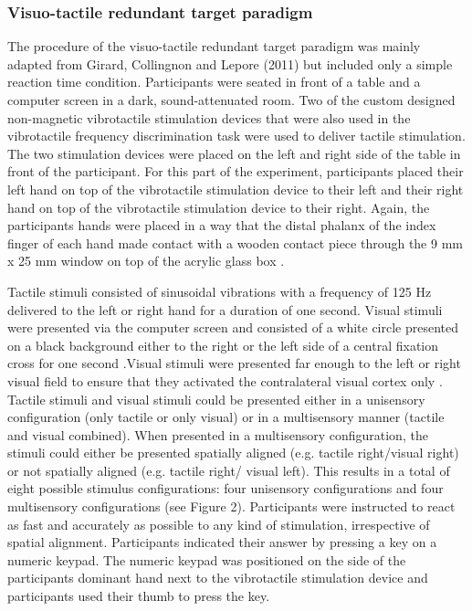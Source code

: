 \documentclass[12pt]{article}
\begin{document}
\subsubsection{Visuo-tactile redundant target paradigm}
The procedure of the visuo-tactile redundant target paradigm was mainly adapted from Girard, Collingnon and Lepore (2011) but included only a simple reaction time condition. Participants were seated in front of a table and a computer screen in a dark, sound-attenuated room. Two of the custom designed non-magnetic vibrotactile stimulation devices that were also used in the vibrotactile frequency discrimination task were used to deliver tactile stimulation. The two stimulation devices were placed on the left and right side of the table in front of the participant. For this part of the experiment, participants placed their left hand on top of the vibrotactile stimulation device to their left and their right hand on top of the vibrotactile stimulation device to their right. 
Again, the participants hands were placed in a way that the distal phalanx of the index finger of each hand made contact with a wooden contact piece through the 9 mm x 25 mm  window on top of the acrylic glass box \parencite[see][]{alary_tactile_2009}. %
\par Tactile stimuli consisted of sinusoidal vibrations with a frequency of 125 Hz \parencite[adapted from][]{auer_vibrotactile_2007} delivered to the left or right hand for a duration of one second. Visual stimuli were presented via the computer screen and consisted of a white circle presented on a black background either to the right or the left side of a central fixation cross for one second .Visual stimuli were presented far enough to the left or right visual field to ensure that they activated the contralateral visual cortex only \parencite[see][]{girard_multisensory_2011}. Tactile stimuli and visual stimuli could be presented either in a unisensory configuration (only tactile or only visual) or in a multisensory manner (tactile and visual combined). When presented in a multisensory configuration, the stimuli could either be presented spatially aligned (e.g. tactile right/visual right) or not spatially aligned (e.g. tactile right/ visual left). This results in a total of eight possible stimulus configurations: four unisensory configurations and four multisensory configurations (see Figure 2). Participants were instructed to react as fast and accurately as possible to any kind of stimulation, irrespective of spatial alignment. Participants indicated their answer by pressing a key on a numeric keypad. The numeric keypad was positioned on the side of the participants dominant hand next to the vibrotactile stimulation device and participants used their thumb to press the key. 
\end{document}
